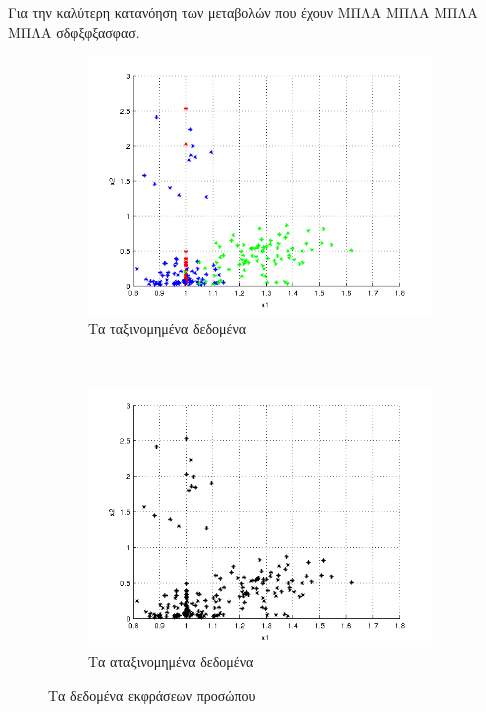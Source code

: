 \documentclass{assignment}
\begin{document}
Για την καλύτερη κατανόηση των μεταβολών που έχουν ΜΠΛΑ ΜΠΛΑ ΜΠΛΑ ΜΠΛΑ σδφξφξασφασ.


\begin{figure}[htbp]
  \centering
  \begin{subfigure}[b]{0.5\textwidth}
     \includegraphics[width=\textwidth,height=0.25\textheight]{matlab/labeled_data_points.png}
  \caption{Τα ταξινομημένα δεδομένα}
  \end{subfigure}%
   ~ %
  \begin{subfigure}[b]{0.5\textwidth}
    \includegraphics[width=\textwidth,height=0.25\textheight]{matlab/unlabeled_data_points.png}
  \caption{Τα αταξινομημένα δεδομένα}
  \end{subfigure}

  \caption{Τα δεδομένα εκφράσεων προσώπου}
\label{fig:data_points}
\end{figure}
\end{document}
